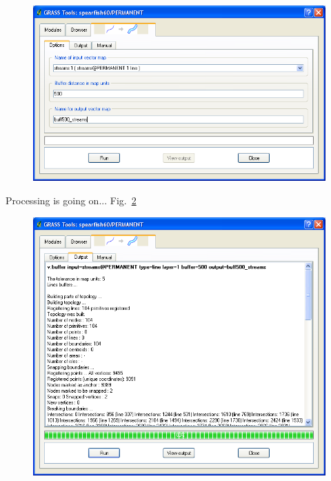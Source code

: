 \begin{figure}[htbp]
   \centering
   \includegraphics[scale=0.3]{qgis034.png}
   \caption{}
   \label{fig:qgis034}
\end{figure}

Processing is going on... Fig.~\ref{fig:qgis035}

\begin{figure}[htbp]
   \centering
   \includegraphics[scale=0.3]{qgis035.png}
   \caption{}
   \label{fig:qgis035}
\end{figure}


